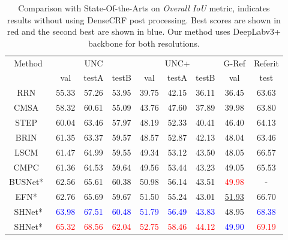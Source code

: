 \documentclass[11pt]{article}
\begin{document}
\begin{table*}[]
\small
\begin{center}
\begin{tabular}{c|ccc|ccc|c|c}
\hline
Method & \multicolumn{3}{c|}{UNC} & \multicolumn{3}{c|}{UNC+} & G-Ref & Referit \\ \cline{2-9} 
 & \multicolumn{1}{c|}{val} & \multicolumn{1}{c|}{testA} & testB & \multicolumn{1}{c|}{val} & \multicolumn{1}{c|}{testA} & testB & val & test \\ \hline
RRN~\cite{Li_2018_CVPR} & 55.33 & 57.26 & 53.95 & 39.75 & 42.15 & 36.11 & 36.45 & 63.63 \\
CMSA~\cite{ye2019cross} & 58.32 & 60.61 & 55.09 & 43.76 & 47.60 & 37.89 & 39.98 & 63.80 \\
STEP~\cite{Chen_2019_ICCV} & 60.04 & 63.46 & 57.97 & 48.19 & 52.33 & 40.41 & 46.40 & 64.13 \\
BRIN~\cite{Hu_2020_CVPR} & 61.35 & 63.37 & 59.57 & 48.57 & 52.87 & 42.13 & 48.04 & 63.46 \\
LSCM~\cite{hui2020linguistic} & 61.47 & 64.99 & 59.55 & 49.34 & 53.12 & 43.50 & 48.05 & 66.57 \\
CMPC~\cite{Huang_2020_CVPR} & 61.36 & 64.53 & 59.64 & 49.56 & 53.44 & 43.23 & 49.05 & 65.53 \\ 
BUSNet*~\cite{Yang_2021_CVPR} & 62.56 & 65.61 & 60.38 & 50.98 & 56.14 & 43.51 & \textcolor{red}{49.98} & - \\ 
EFN*~\cite{Feng_2021_CVPR} & 62.76 & 65.69 & 59.67 & 51.50 & 55.24 & 43.01 & \underline{51.93} & 66.70 \\ \hline
SHNet*  & \textcolor{blue}{63.98} & \textcolor{blue}{67.51} & \textcolor{blue}{60.48} & \textcolor{blue}{51.79} & \textcolor{blue}{56.49} & \textcolor{blue}{43.83} & 48.95 & \textcolor{blue}{68.38}  \\ 
SHNet*  & \textcolor{red}{65.32} & \textcolor{red}{68.56} & \textcolor{red}{62.04} & \textcolor{red}{52.75} & \textcolor{red}{58.46} & \textcolor{red}{44.12} & \textcolor{blue}{49.90} & \textcolor{red}{69.19}  \\ \hline

\end{tabular}
\end{center}
\caption{Comparison with State-Of-the-Arts on \textit{Overall IoU} metric,  indicates results without using DenseCRF post processing. Best scores are shown in red and the second best are shown in blue. Our method uses DeepLabv3+ backbone for both resolutions.}
\label{table:overall_IoU}
\end{table*}
\end{document}
